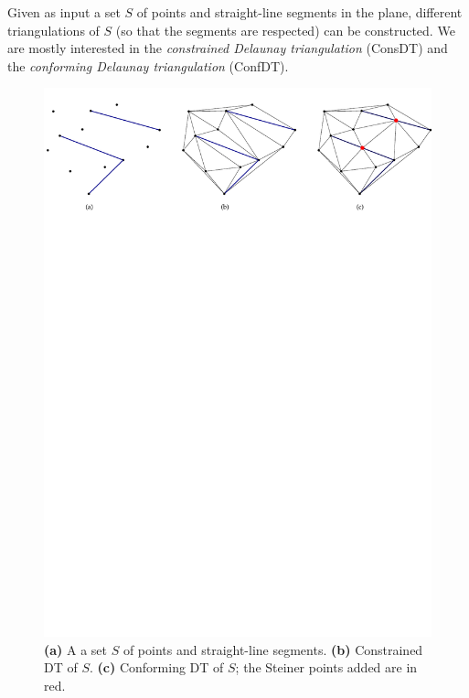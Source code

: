 Given as input a set $S$ of points and straight-line segments in the plane, different triangulations of $S$ (so that the segments are respected) can be constructed. 
We are mostly interested in the \emph{constrained Delaunay triangulation} (ConsDT) and the \emph{conforming Delaunay triangulation} (ConfDT).
\begin{figure}
  \centering
  \includegraphics[width=\linewidth]{figs/cdt_example}
  \caption{\textbf{(a)} A a set $S$ of points and straight-line segments. \textbf{(b)} Constrained DT of $S$. \textbf{(c)} Conforming DT of $S$; the Steiner points added are in red.}%
\label{fig:cdt_example}
\end{figure}

%
